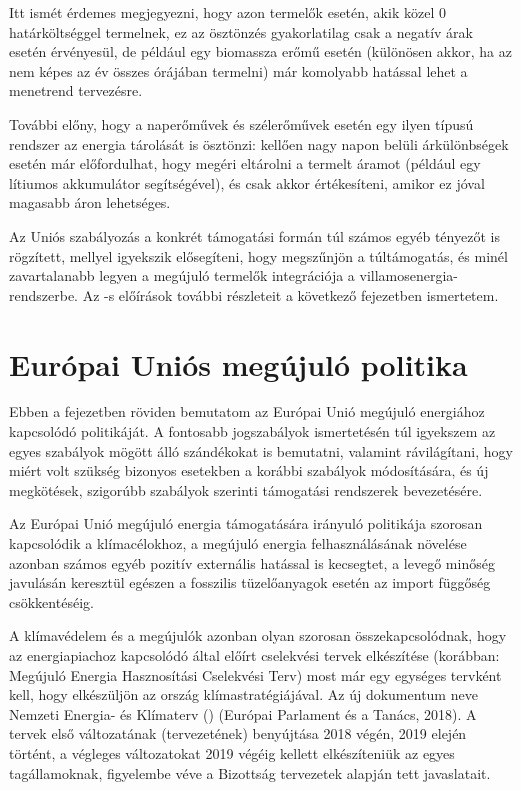 \documentclass[twoside, magyar, showtrims]{corvinusphd}
\begin{document}
Itt ismét érdemes megjegyezni, hogy azon termelők esetén,
akik közel 0 határköltséggel termelnek,
ez az ösztönzés gyakorlatilag csak a negatív árak
esetén érvényesül, de például egy biomassza
erőmű esetén (különösen akkor, ha az nem képes az év
összes órájában termelni) már komolyabb hatással
lehet a menetrend tervezésre.

További előny, hogy a naperőművek és
szélerőművek esetén egy ilyen típusú
rendszer az energia tárolását is ösztönzi:
kellően nagy napon belüli árkülönbségek
esetén már előfordulhat, hogy megéri eltárolni
a termelt áramot (például egy lítiumos akkumulátor 
segítségével), és csak akkor értékesíteni,
amikor ez jóval magasabb áron lehetséges.

Az Uniós szabályozás a konkrét támogatási formán túl
számos egyéb tényezőt is rögzített, mellyel igyekszik elősegíteni,
hogy megszűnjön a túltámogatás, és minél zavartalanabb legyen
a megújuló termelők integrációja a villamosenergia-rendszerbe.
Az -s előírások további részleteit a következő fejezetben
ismertetem.

\section{Európai Uniós megújuló politika}

Ebben a fejezetben röviden bemutatom az Európai Unió
megújuló energiához kapcsolódó politikáját.
A fontosabb jogszabályok ismertetésén túl igyekszem az
egyes szabályok mögött álló szándékokat is bemutatni,
valamint rávilágítani, hogy miért volt szükség bizonyos
esetekben a korábbi szabályok módosítására, 
és új megkötések, szigorúbb szabályok szerinti
támogatási rendszerek bevezetésére.

Az Európai Unió megújuló energia támogatására irányuló
politikája szorosan kapcsolódik a klímacélokhoz,
a megújuló energia felhasználásának
növelése azonban számos egyéb
pozitív externális hatással is kecsegtet,
a levegő minőség javulásán
keresztül egészen a fosszilis tüzelőanyagok
esetén az import függőség csökkentéséig.

A klímavédelem és a megújulók azonban olyan
szorosan összekapcsolódnak, hogy az energiapiachoz kapcsolódó
 által előírt cselekvési tervek elkészítése (korábban:
Megújuló Energia Hasznosítási Cselekvési Terv) most már 
egy egységes tervként kell, hogy
elkészüljön az ország klímastratégiájával.
Az új dokumentum neve Nemzeti
Energia- és Klímaterv ()
(Európai Parlament és a Tanács, 2018).
A tervek első változatának (tervezetének)
benyújtása 2018 végén, 2019 elején
történt, a végleges változatokat 2019
végéig kellett elkészíteniük az egyes tagállamoknak,
figyelembe véve a Bizottság tervezetek
alapján tett javaslatait.
\end{document}
